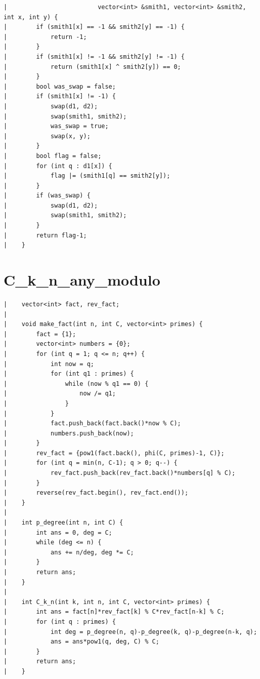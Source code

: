 \documentclass[a4paper, 10pt]{article}
\begin{document}
\begin{center}
\begin{verbatim}
|                         vector<int> &smith1, vector<int> &smith2, int x, int y) {
|        if (smith1[x] == -1 && smith2[y] == -1) {
|            return -1;
|        }
|        if (smith1[x] != -1 && smith2[y] != -1) {
|            return (smith1[x] ^ smith2[y]) == 0;
|        }
|        bool was_swap = false;
|        if (smith1[x] != -1) {
|            swap(d1, d2);
|            swap(smith1, smith2);
|            was_swap = true;
|            swap(x, y);
|        }
|        bool flag = false;
|        for (int q : d1[x]) {
|            flag |= (smith1[q] == smith2[y]);
|        }
|        if (was_swap) {
|            swap(d1, d2);
|            swap(smith1, smith2);
|        }
|        return flag-1;
|    }
\end{verbatim}

\section*{C\_k\_n\_any\_modulo}
\begin{verbatim}
|    vector<int> fact, rev_fact;
|    
|    void make_fact(int n, int C, vector<int> primes) {
|        fact = {1};
|        vector<int> numbers = {0};
|        for (int q = 1; q <= n; q++) {
|            int now = q;
|            for (int q1 : primes) {
|                while (now % q1 == 0) {
|                    now /= q1;
|                }
|            }
|            fact.push_back(fact.back()*now % C);
|            numbers.push_back(now);
|        }
|        rev_fact = {pow1(fact.back(), phi(C, primes)-1, C)};
|        for (int q = min(n, C-1); q > 0; q--) {
|            rev_fact.push_back(rev_fact.back()*numbers[q] % C);
|        }
|        reverse(rev_fact.begin(), rev_fact.end());
|    }
|    
|    int p_degree(int n, int C) {
|        int ans = 0, deg = C;
|        while (deg <= n) {
|            ans += n/deg, deg *= C;
|        }
|        return ans;
|    }
|    
|    int C_k_n(int k, int n, int C, vector<int> primes) {
|        int ans = fact[n]*rev_fact[k] % C*rev_fact[n-k] % C;
|        for (int q : primes) {
|            int deg = p_degree(n, q)-p_degree(k, q)-p_degree(n-k, q);
|            ans = ans*pow1(q, deg, C) % C;
|        }
|        return ans;
|    }
\end{verbatim}


\end{center}
\end{document}
